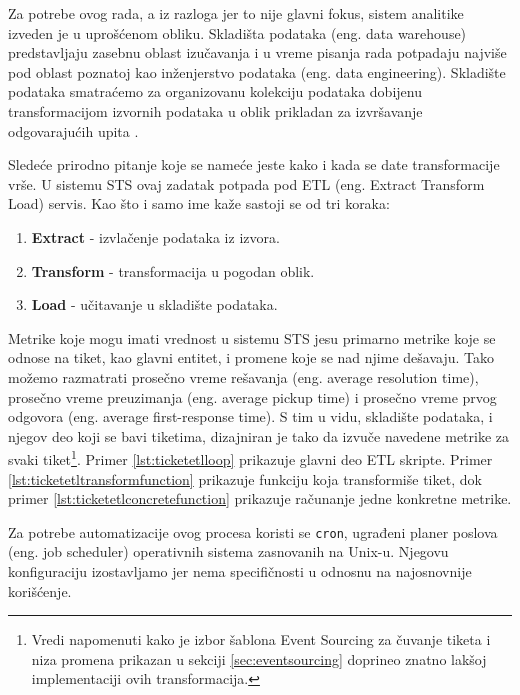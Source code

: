 \documentclass[12pt,oneside]{memoir}
\begin{document}
Za potrebe ovog rada, a iz razloga jer to nije glavni fokus, sistem analitike izveden je u uprošćenom obliku. Skladišta podataka (eng. data warehouse) predstavljaju zasebnu oblast izučavanja i u vreme pisanja rada potpadaju najviše pod oblast poznatoj kao inženjerstvo podataka (eng. data engineering). Skladište podataka smatraćemo za organizovanu kolekciju podataka dobijenu transformacijom izvornih podataka u oblik prikladan za izvršavanje odgovarajućih upita \cite{dataanalytics}.

Sledeće prirodno pitanje koje se nameće jeste kako i kada se date transformacije vrše. U sistemu STS ovaj zadatak potpada pod ETL (eng. Extract Transform Load) servis. Kao što i samo ime kaže sastoji se od tri koraka:
\begin{enumerate}
    \item \textbf{Extract} - izvlačenje podataka iz izvora.
    \item \textbf{Transform} - transformacija u pogodan oblik.
    \item \textbf{Load} - učitavanje u skladište podataka.
\end{enumerate}

Metrike koje mogu imati vrednost u sistemu STS jesu primarno metrike koje se odnose na tiket, kao glavni entitet, i promene koje se nad njime dešavaju. Tako možemo razmatrati prosečno vreme rešavanja (eng. average resolution time), prosečno vreme preuzimanja (eng. average pickup time) i prosečno vreme prvog odgovora (eng. average first-response time). S tim u vidu, skladište podataka, i njegov deo koji se bavi tiketima, dizajniran je tako da izvuče navedene metrike za svaki tiket\footnote{Vredi napomenuti kako je izbor šablona Event Sourcing za čuvanje tiketa i niza promena prikazan u sekciji \ref{sec:eventsourcing} doprineo znatno lakšoj implementaciji ovih transformacija.}. Primer \ref{lst:ticketetlloop} prikazuje glavni deo ETL skripte. Primer \ref{lst:ticketetltransformfunction} prikazuje funkciju koja transformiše tiket, dok primer \ref{lst:ticketetlconcretefunction} prikazuje računanje jedne konkretne metrike.

Za potrebe automatizacije ovog procesa koristi se \verb|cron|, ugrađeni planer poslova (eng. job scheduler) operativnih sistema zasnovanih na Unix-u. Njegovu konfiguraciju izostavljamo jer nema specifičnosti u odnosnu na najosnovnije korišćenje.
\end{document}
